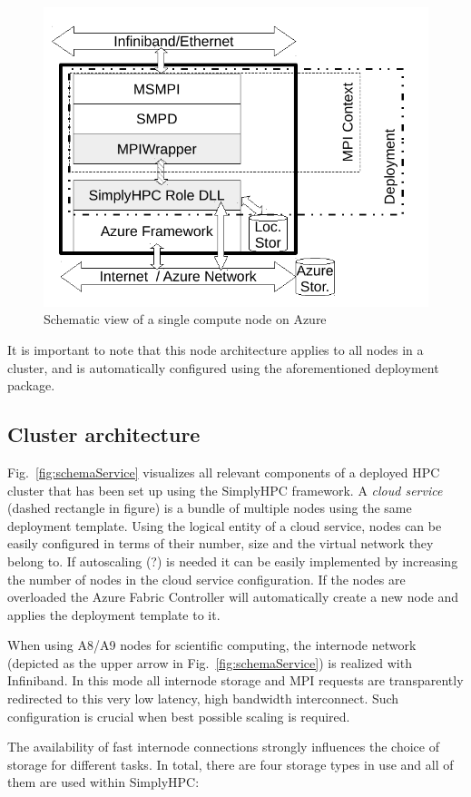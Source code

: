 \documentclass[3p,times]{elsarticle}
\begin{document}
\begin{figure}[h]
	\centering
	\includegraphics[width=.5\linewidth]{azureWorkerRole.pdf}
	\caption{Schematic view of a single compute node on Azure}

	\label{fig:schemaRole}
\end{figure}

It is important to note that this node architecture applies to all nodes in a cluster, and is automatically configured using the aforementioned deployment package. 


\subsection{Cluster architecture}

Fig.~\ref{fig:schemaService} visualizes all relevant components of a deployed HPC cluster that has been set up using the SimplyHPC framework. 
A \textit{cloud service} (dashed rectangle in figure) is a bundle of multiple nodes using the same deployment template. Using the logical entity of a cloud service, nodes can be easily configured in terms of their number, size and the virtual network they belong to. If autoscaling (?) is needed it can be easily implemented by increasing the number of nodes in the cloud service configuration. If the nodes are overloaded the Azure Fabric Controller will automatically create a new node and applies the deployment template to it.

When using A8/A9 nodes for scientific computing, the internode network (depicted as the upper arrow in Fig.~\ref{fig:schemaService}) is realized with Infiniband. In this mode all internode storage and MPI requests are transparently redirected to this very low latency, high bandwidth interconnect. Such configuration is crucial when best possible scaling is required.

The availability of fast internode connections strongly influences the choice of storage for different tasks. In total, there are four storage types in use and all of them are used within SimplyHPC:
\end{document}
